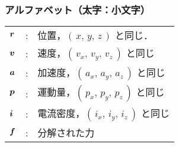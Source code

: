     \subsubsection*{アルファベット（太字：小文字）}
    \begin{tabular}{lll}
        $\boldsymbol{r}$                   &:  & 位置，$(\,x,\,y,\,z\,)$ と同じ．                                      \\
        $\boldsymbol{v}$                   &:  & 速度，$(\,v_{x},\,v_{y},\,v_{z}\,)$ と同じ                            \\
        $\boldsymbol{a}$                   &:  & 加速度，$(\,a_{x},\,a_{y},\,a_{z}\,)$ と同じ                          \\
        $\boldsymbol{p}$                   &:  & 運動量，$(\,p_{x},\,p_{y},\,p_{z}\,)$ と同じ                          \\
        $\boldsymbol{i}$                   &:  & 電流密度，$(\,i_{x},\,i_{y},\,i_{z}\,)$ と同じ                        \\
        $\boldsymbol{f}$                 &:  & 分解された力                                                          %
    \end{tabular}

